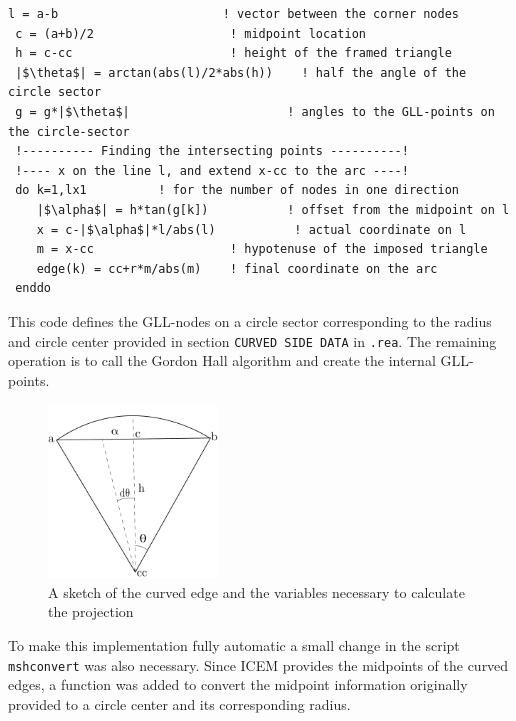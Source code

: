 \begingroup
\begin{lstlisting}[escapechar=|,frame=none]
 l = a-b                       ! vector between the corner nodes
 c = (a+b)/2                   ! midpoint location
 h = c-cc                      ! height of the framed triangle
 |$\theta$| = arctan(abs(l)/2*abs(h))    ! half the angle of the circle sector
 g = g*|$\theta$|                      ! angles to the GLL-points on the circle-sector
 !---------- Finding the intersecting points ----------!
 !---- x on the line l, and extend x-cc to the arc ----!
 do k=1,lx1          ! for the number of nodes in one direction
    |$\alpha$| = h*tan(g[k])           ! offset from the midpoint on l
    x = c-|$\alpha$|*l/abs(l)           ! actual coordinate on l
    m = x-cc                   ! hypotenuse of the imposed triangle
    edge(k) = cc+r*m/abs(m)    ! final coordinate on the arc
 enddo
\end{lstlisting}
\endgroup
This code defines the GLL-nodes on a circle sector corresponding to the radius and circle center
provided in section \verb|CURVED SIDE DATA| in \verb|.rea|.
The remaining operation is to call the Gordon Hall algorithm and create the internal GLL-points.
%
\begin{figure}[h]
    \centering
    \includegraphics[width = 0.4\textwidth]{Figures/curvature.pdf}
    \caption{A sketch of the curved edge and the variables necessary to calculate the projection}
    \label{fig:curvature}
\end{figure}
%
To make this implementation fully automatic a small change in the script \verb|mshconvert| was also necessary. 
Since ICEM provides the midpoints of the curved edges, a function was added to convert the midpoint information 
originally provided to a circle center and its corresponding radius.
